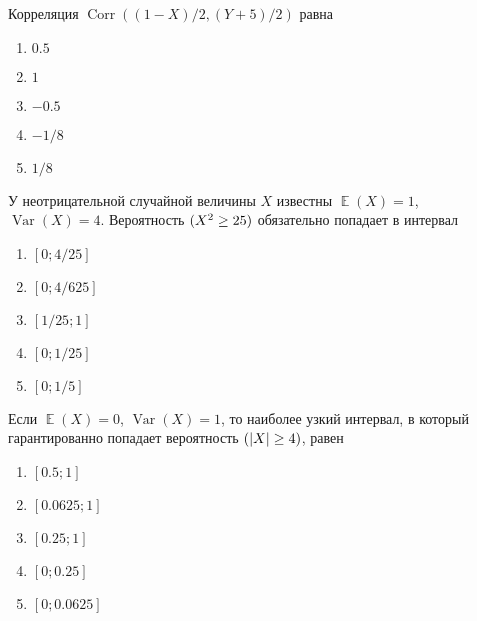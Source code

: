 \documentclass[t]{beamer}
\DeclareMathOperator{\Var}{Var}
\DeclareMathOperator{\Corr}{Corr}
\DeclareMathOperator{\E}{\mathbb{E}}
\let\P\relax
\DeclareMathOperator{\P}{\mathbb{P}}
\begin{document}
 \begin{frame} \label{26} 
\begin{block}{26} 

Корреляция $\Corr((1-X)/2,(Y+5)/2)$ равна
 


 \end{block} 
\begin{enumerate} 
\item[] \hyperlink{26-Yes}{\beamergotobutton{} $0.5$}
\item[] \hyperlink{26-No}{\beamergotobutton{} $1$
}
\item[] \hyperlink{26-No}{\beamergotobutton{} $-0.5$}
\item[] \hyperlink{26-No}{\beamergotobutton{} $-1/8$}
\item[] \hyperlink{26-No}{\beamergotobutton{} $1/8$}
\end{enumerate} 
\end{frame} 


 \begin{frame} \label{27} 
\begin{block}{27} 
У неотрицательной случайной величины $X$ известны $\E(X)=1$, $\Var(X)=4$. Вероятность $\P(X^2 \geq 25)$ обязательно попадает в интервал
 


 \end{block} 
\begin{enumerate} 
\item[] \hyperlink{27-No}{\beamergotobutton{} $[0;4/25]$}
\item[] \hyperlink{27-No}{\beamergotobutton{} $[0;4/625]$}
\item[] \hyperlink{27-No}{\beamergotobutton{} $[1/25;1]$}
\item[] \hyperlink{27-No}{\beamergotobutton{} $[0;1/25]$}
\item[] \hyperlink{27-Yes}{\beamergotobutton{} $[0;1/5]$}
\end{enumerate} 
\end{frame} 


 \begin{frame} \label{28} 
\begin{block}{28} 

Если $\E(X)=0$, $\Var(X)=1$, то наиболее узкий интервал, в который гарантированно попадает вероятность $\P(|X| \geq 4)$, равен


 \end{block} 
\begin{enumerate} 
\item[] \hyperlink{28-No}{\beamergotobutton{} $[0.5; 1]$
}
\item[] \hyperlink{28-No}{\beamergotobutton{} $[0.0625; 1]$}
\item[] \hyperlink{28-No}{\beamergotobutton{} $[0.25; 1]$}
\item[] \hyperlink{28-No}{\beamergotobutton{} $[0; 0.25]$}
\item[] \hyperlink{28-Yes}{\beamergotobutton{} $[0; 0.0625]$ }
\end{enumerate} 
\end{frame} 
\end{document}
